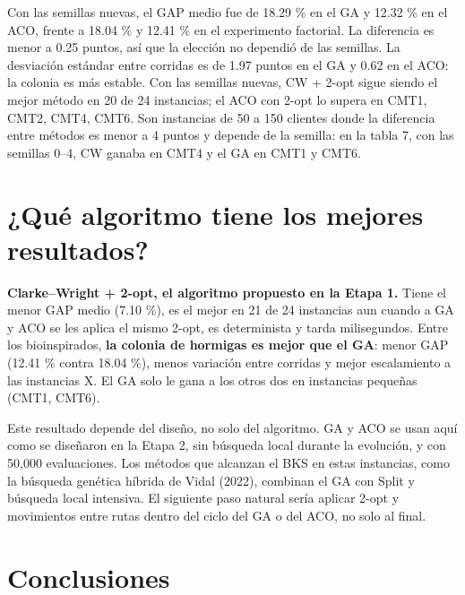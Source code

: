 \documentclass[11pt,letterpaper]{article}
\begin{document}
Con las semillas nuevas, el GAP medio fue de 18.29 \% en el GA y 12.32 \% en el ACO, frente a 18.04 \% y 12.41 \% en el experimento factorial. La diferencia es menor a 0.25 puntos, así que la elección no dependió de las semillas. La desviación estándar entre corridas es de 1.97 puntos en el GA y 0.62 en el ACO: la colonia es más estable. Con las semillas nuevas, CW + 2-opt sigue siendo el mejor método en 20 de 24 instancias; el ACO con 2-opt lo supera en CMT1, CMT2, CMT4, CMT6. Son instancias de 50 a 150 clientes donde la diferencia entre métodos es menor a 4 puntos y depende de la semilla: en la tabla 7, con las semillas 0--4, CW ganaba en CMT4 y el GA en CMT1 y CMT6.

\hypertarget{quuxe9-algoritmo-tiene-los-mejores-resultados}{%
\section{¿Qué algoritmo tiene los mejores resultados?}\label{quuxe9-algoritmo-tiene-los-mejores-resultados}}

\textbf{Clarke--Wright + 2-opt, el algoritmo propuesto en la Etapa 1.} Tiene el menor GAP medio (7.10 \%), es el mejor en 21 de 24 instancias aun cuando a GA y ACO se les aplica el mismo 2-opt, es determinista y tarda milisegundos. Entre los bioinspirados, \textbf{la colonia de hormigas es mejor que el GA}: menor GAP (12.41 \% contra 18.04 \%), menos variación entre corridas y mejor escalamiento a las instancias X. El GA solo le gana a los otros dos en instancias pequeñas (CMT1, CMT6).

Este resultado depende del diseño, no solo del algoritmo. GA y ACO se usan aquí como se diseñaron en la Etapa 2, sin búsqueda local durante la evolución, y con 50,000 evaluaciones. Los métodos que alcanzan el BKS en estas instancias, como la búsqueda genética híbrida de Vidal (2022), combinan el GA con Split y búsqueda local intensiva. El siguiente paso natural sería aplicar 2-opt y movimientos entre rutas dentro del ciclo del GA o del ACO, no solo al final.

\hypertarget{conclusiones}{%
\section{Conclusiones}\label{conclusiones}}
\end{document}
